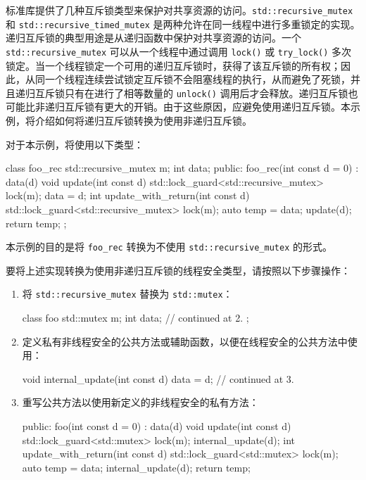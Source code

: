 
标准库提供了几种互斥锁类型来保护对共享资源的访问。\verb|std::recursive_mutex| 和 \verb|std::recursive_timed_mutex| 是两种允许在同一线程中进行多重锁定的实现。递归互斥锁的典型用途是从递归函数中保护对共享资源的访问。一个 \verb|std::recursive_mutex| 可以从一个线程中通过调用 \verb|lock()| 或 \verb|try_lock()| 多次锁定。当一个线程锁定一个可用的递归互斥锁时，获得了该互斥锁的所有权；因此，从同一个线程连续尝试锁定互斥锁不会阻塞线程的执行，从而避免了死锁，并且递归互斥锁只有在进行了相等数量的 \verb|unlock()| 调用后才会释放。递归互斥锁也可能比非递归互斥锁有更大的开销。由于这些原因，应避免使用递归互斥锁。本示例，将介绍如何将递归互斥锁转换为使用非递归互斥锁。




对于本示例，将使用以下类型：

\begin{cpp}
class foo_rec
{
    std::recursive_mutex m;
    int data;
public:
    foo_rec(int const d = 0) : data(d) {}
    void update(int const d)
    {
        std::lock_guard<std::recursive_mutex> lock(m);
        data = d;
    }
    int update_with_return(int const d)
    {
        std::lock_guard<std::recursive_mutex> lock(m);
        auto temp = data;
        update(d);
        return temp;
    }
};
\end{cpp}

本示例的目的是将 \verb|foo_rec| 转换为不使用 \verb|std::recursive_mutex| 的形式。


要将上述实现转换为使用非递归互斥锁的线程安全类型，请按照以下步骤操作：

\begin{enumerate}
\item
将 \verb|std::recursive_mutex| 替换为 \verb|std::mutex|：

\begin{cpp}
class foo
{
    std::mutex m;
    int        data;
    // continued at 2.
};
\end{cpp}

\item
定义私有非线程安全的公共方法或辅助函数，以便在线程安全的公共方法中使用：

\begin{cpp}
void internal_update(int const d) { data = d; }
// continued at 3.
\end{cpp}

\item
重写公共方法以使用新定义的非线程安全的私有方法：

\begin{cpp}
public:
    foo(int const d = 0) : data(d) {}
    void update(int const d)
    {
        std::lock_guard<std::mutex> lock(m);
        internal_update(d);
    }
    int update_with_return(int const d)
    {
        std::lock_guard<std::mutex> lock(m);
        auto temp = data;
        internal_update(d);
        return temp;
    }
\end{cpp}
\end{enumerate}

